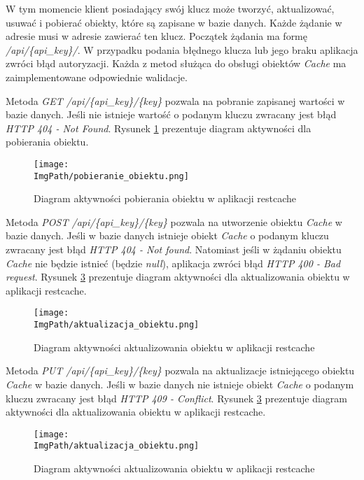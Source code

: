 W tym momencie klient posiadający swój klucz może tworzyć, aktualizować, usuwać i pobierać obiekty, które są zapisane w bazie danych. Każde żądanie w adresie musi w adresie zawierać ten klucz. Początek żądania ma formę \textsl{/api/\{api\_key\}/}. W przypadku podania błędnego klucza lub jego braku aplikacja zwróci błąd autoryzacji. Każda z metod służąca do obsługi obiektów \textsl{Cache} ma zaimplementowane odpowiednie walidacje. 

Metoda \textsl{GET /api/\{api\_key\}/\{key\}} pozwala na pobranie zapisanej wartości w bazie danych. Jeśli nie istnieje wartość o podanym kluczu zwracany jest błąd \textsl{HTTP 404 - Not Found}. Rysunek \ref{fig:pobieranie_obiektu} prezentuje diagram aktywności dla pobierania obiektu.
\begin{figure}[!ht]
\centering
\texttt{[image: \\ImgPath/pobieranie\_obiektu.png]}
\caption{Diagram aktywności pobierania obiektu w aplikacji restcache}
\label{fig:pobieranie_obiektu}
\end{figure}

Metoda \textsl{POST /api/\{api\_key\}/\{key\}} pozwala na utworzenie obiektu \textsl{Cache} w bazie danych. Jeśli w bazie danych istnieje obiekt \textsl{Cache} o podanym kluczu zwracany jest błąd \textsl{HTTP 404 - Not found}. Natomiast jeśli w żądaniu obiektu \textsl{Cache} nie będzie istnieć (będzie \textsl{null}), aplikacja zwróci błąd \textsl{HTTP 400 - Bad request}.  Rysunek \ref{fig:aktualizowanie_obiektu} prezentuje diagram aktywności dla aktualizowania obiektu w aplikacji restcache.
\begin{figure}[!ht]
\centering
\texttt{[image: \\ImgPath/aktualizacja\_obiektu.png]}
\caption{Diagram aktywności aktualizowania obiektu w aplikacji restcache}
\label{fig:aktualizowanie_obiektu}
\end{figure}

Metoda \textsl{PUT /api/\{api\_key\}/\{key\}} pozwala na aktualizacje istniejącego obiektu \textsl{Cache} w bazie danych. Jeśli w bazie danych nie  istnieje obiekt \textsl{Cache} o podanym kluczu zwracany jest błąd \textsl{HTTP 409 - Conflict}. Rysunek \ref{fig:aktualizowanie_obiektu} prezentuje diagram aktywności dla aktualizowania obiektu w aplikacji restcache.
\begin{figure}[!ht]
\centering
\texttt{[image: \\ImgPath/aktualizacja\_obiektu.png]}
\caption{Diagram aktywności aktualizowania obiektu w aplikacji restcache}
\label{fig:aktualizowanie_obiektu}
\end{figure}

